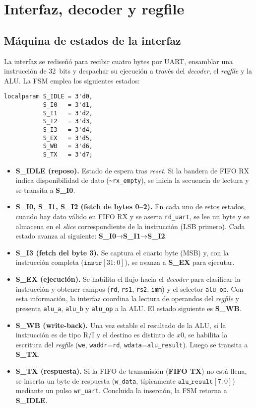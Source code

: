 \section{Interfaz, decoder y regfile}

\subsection{Máquina de estados de la interfaz}

La interfaz se rediseñó para recibir cuatro bytes por UART, ensamblar una instrucción de 32~bits y despachar su ejecución a través del \textit{decoder}, el \textit{regfile} y la ALU. La FSM emplea los siguientes estados:

\begin{verbatim}
localparam S_IDLE = 3'd0,
           S_I0   = 3'd1,
           S_I1   = 3'd2,
           S_I2   = 3'd3,
           S_I3   = 3'd4,
           S_EX   = 3'd5,
           S_WB   = 3'd6,
           S_TX   = 3'd7;
\end{verbatim}


\begin{itemize}
    \item \textbf{S\_IDLE (reposo).} Estado de espera tras \textit{reset}. Si la bandera de FIFO RX indica disponibilidad de dato (\texttt{\textasciitilde rx\_empty}), se inicia la secuencia de lectura y se transita a \textbf{S\_I0}.
    \item \textbf{S\_I0, S\_I1, S\_I2 (fetch de bytes 0--2).} En cada uno de estos estados, cuando hay dato válido en FIFO RX y se aserta \texttt{rd\_uart}, se lee un byte y se almacena en el \textit{slice} correspondiente de la instrucción (LSB primero). Cada estado avanza al siguiente: \textbf{S\_I0}→\textbf{S\_I1}→\textbf{S\_I2}.
    \item \textbf{S\_I3 (fetch del byte 3).} Se captura el cuarto byte (MSB) y, con la instrucción completa (\(\texttt{instr}[31{:}0]\)), se avanza a \textbf{S\_EX} para ejecutar.
    \item \textbf{S\_EX (ejecución).} Se habilita el flujo hacia el \textit{decoder} para clasificar la instrucción y obtener campos (\texttt{rd}, \texttt{rs1}, \texttt{rs2}, \texttt{imm}) y el selector \texttt{alu\_op}. Con esta información, la interfaz coordina la lectura de operandos del \textit{regfile} y presenta \texttt{alu\_a}, \texttt{alu\_b} y \texttt{alu\_op} a la ALU. El estado siguiente es \textbf{S\_WB}.
    \item \textbf{S\_WB (write-back).} Una vez estable el resultado de la ALU, si la instrucción es de tipo R/I y el destino es distinto de \(x0\), se habilita la escritura del \textit{regfile} (\texttt{we}, \texttt{waddr}=\texttt{rd}, \texttt{wdata}=\texttt{alu\_result}). Luego se transita a \textbf{S\_TX}.
    \item \textbf{S\_TX (respuesta).} Si la FIFO de transmisión (\textbf{FIFO TX}) no está llena, se inserta un byte de respuesta (\texttt{w\_data}, típicamente \(\texttt{alu\_result}[7{:}0]\)) mediante un pulso \texttt{wr\_uart}. Concluida la inserción, la FSM retorna a \textbf{S\_IDLE}.
\end{itemize}

